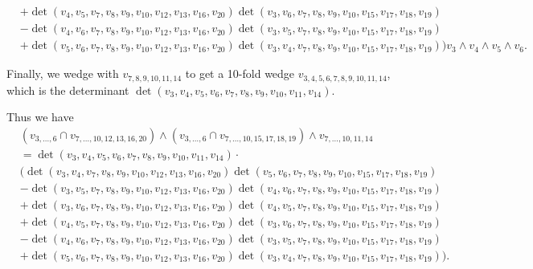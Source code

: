 \begin{example}
{\begin{align*}
     &+ \det\left(v_{4},v_{5},v_{7}, v_{8}, v_{9}, v_{10}, v_{12}, v_{13}, v_{16}, v_{20}\right) \det\left(v_{3},v_{6},v_7,v_8,v_9,v_{10},v_{15}, v_{17}, v_{18}, v_{19}\right) \nonumber \\
     &- \det\left(v_{4},v_{6},v_{7}, v_{8}, v_{9}, v_{10}, v_{12}, v_{13}, v_{16}, v_{20}\right) \det\left(v_{3},v_{5},v_7,v_8,v_9,v_{10},v_{15}, v_{17}, v_{18}, v_{19}\right) \nonumber \\
     &+ \det\left(v_{5},v_{6},v_{7}, v_{8}, v_{9}, v_{10}, v_{12}, v_{13}, v_{16}, v_{20}\right) \det\left(v_{3},v_{4},v_7,v_8,v_9,v_{10},v_{15}, v_{17}, v_{18}, v_{19}\right) \Bigg)v_{3} \wedge v_{4} \wedge v_{5} \wedge v_{6}. \nonumber
\end{align*}
}

Finally, we wedge with $v_{7,8,9,10,11,14}$ to get  a 10-fold wedge $v_{3,4,5,6,7,8,9,10,11,14}$, which is the determinant $\det\left(v_3,v_4,v_5, v_6, v_7, v_8, v_9, v_{10}, v_{11}, v_{14}\right).$


Thus we have 
{\small
\begin{align}
&(v_{3,\dots,6}  \cap v_{7,\dots,10,12,13,16,20} ) \wedge 
\left(v_{3,\dots,6} \cap v_{7,\dots,10,15,17,18,19} \right) \wedge v_{7,\dots,10,11,14} \nonumber \\
 &= \det\left(v_3,v_4,v_5, v_6, v_7, v_8, v_9, v_{10},v_{11}, v_{14}\right) \cdot \nonumber \\
&\Bigg( \det\left(v_{3},v_{4}, v_{7}, v_{8}, v_{9}, v_{10}, v_{12}, v_{13}, v_{16}, v_{20}\right)  \det\left(v_{5},v_{6},v_7,v_8,v_9,v_{10},v_{15}, v_{17}, v_{18}, v_{19}\right) \nonumber \\
     &- \det\left(v_{3},v_{5},v_{7}, v_{8}, v_{9}, v_{10}, v_{12}, v_{13}, v_{16}, v_{20}\right) \det\left(v_{4},v_{6},v_7,v_8,v_9,v_{10},v_{15}, v_{17}, v_{18}, v_{19}\right) \nonumber \\
     &+ \det\left(v_{3},v_{6},v_{7}, v_{8}, v_{9}, v_{10}, v_{12}, v_{13}, v_{16}, v_{20}\right) \det\left(v_{4},v_{5},v_7,v_8,v_9,v_{10},v_{15}, v_{17}, v_{18}, v_{19}\right) \nonumber \\
     &+ \det\left(v_{4},v_{5},v_{7}, v_{8}, v_{9}, v_{10}, v_{12}, v_{13}, v_{16}, v_{20}\right) \det\left(v_{3},v_{6},v_7,v_8,v_9,v_{10},v_{15}, v_{17}, v_{18}, v_{19}\right) \nonumber \\
     &- \det\left(v_{4},v_{6},v_{7}, v_{8}, v_{9}, v_{10}, v_{12}, v_{13}, v_{16}, v_{20}\right) \det\left(v_{3},v_{5},v_7,v_8,v_9,v_{10},v_{15}, v_{17}, v_{18}, v_{19}\right) \nonumber \\
     &+ \det\left(v_{5},v_{6},v_{7}, v_{8}, v_{9}, v_{10}, v_{12}, v_{13}, v_{16}, v_{20}\right) \det\left(v_{3},v_{4},v_7,v_8,v_9,v_{10},v_{15}, v_{17}, v_{18}, v_{19}\right)\Bigg). \nonumber
\end{align}
}



\end{example}
